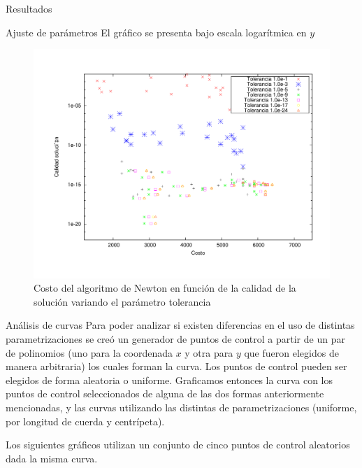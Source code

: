 \begin{section}{Resultados}
\begin{subsection}{Ajuste de parámetros}
		El gráfico se presenta bajo escala logarítmica en $y$\\

		\begin{figure}[H]
		  \centering
			\includegraphics[width=14cm]{graficos/tol_graf.pdf}
		  \caption{Costo del algoritmo de Newton en función de la calidad de la solución variando el parámetro tolerancia}
		  \label{fig:5p_r}
		\end{figure}
		
		\VSP
	\end{subsection}

	\begin{subsection}{Análisis de curvas}
		Para poder analizar si existen diferencias en el uso de distintas parametrizaciones se creó un generador de puntos de control a partir de un par de polinomios (uno para la coordenada $x$ y otra para $y$ que fueron elegidos de manera arbitraria) los cuales forman la curva. Los puntos de control pueden ser elegidos de forma aleatoria o uniforme. Graficamos entonces la curva con los puntos de control seleccionados de alguna de las dos formas anteriormente mencionadas, y las curvas utilizando las distintas de parametrizaciones (uniforme, por longitud de cuerda y centrípeta).
		
		Los siguientes gráficos utilizan un conjunto de cinco puntos de control aleatorios dada la misma curva.
				

\end{subsection}
\end{section}
